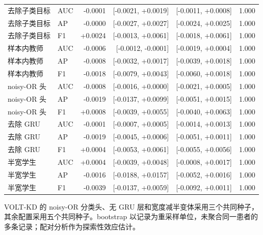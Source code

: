 \documentclass[11pt,a4paper,UTF8,fontset=windows]{ctexart}
\begin{document}
\begin{table}[htbp]
\begin{tabularx}{\linewidth}{Ylrrrr}
去除子类目标 & AUC & -0.0001 & [-0.0021, +0.0019] & [-0.0011, +0.0008] & 1.000 \\
去除子类目标 & AP & -0.0000 & [-0.0027, +0.0027] & [-0.0024, +0.0025] & 1.000 \\
去除子类目标 & F1 & +0.0024 & [-0.0013, +0.0061] & [-0.0018, +0.0061] & 1.000 \\
样本内教师 & AUC & -0.0006 & [-0.0012, -0.0001] & [-0.0019, +0.0004] & 1.000 \\
样本内教师 & AP & -0.0008 & [-0.0032, +0.0017] & [-0.0039, +0.0018] & 1.000 \\
样本内教师 & F1 & -0.0018 & [-0.0079, +0.0043] & [-0.0060, +0.0018] & 1.000 \\
noisy-OR 头 & AUC & -0.0008 & [-0.0016, +0.0000] & [-0.0021, +0.0005] & 1.000 \\
noisy-OR 头 & AP & -0.0019 & [-0.0137, +0.0099] & [-0.0051, +0.0015] & 1.000 \\
noisy-OR 头 & F1 & +0.0008 & [-0.0039, +0.0055] & [-0.0040, +0.0063] & 1.000 \\
去除 GRU & AUC & -0.0001 & [-0.0007, +0.0005] & [-0.0014, +0.0013] & 1.000 \\
去除 GRU & AP & -0.0019 & [-0.0045, +0.0006] & [-0.0051, +0.0011] & 1.000 \\
去除 GRU & F1 & +0.0004 & [-0.0053, +0.0061] & [-0.0055, +0.0056] & 1.000 \\
半宽学生 & AUC & +0.0004 & [-0.0039, +0.0048] & [-0.0008, +0.0017] & 1.000 \\
半宽学生 & AP & -0.0016 & [-0.0188, +0.0157] & [-0.0052, +0.0016] & 1.000 \\
半宽学生 & F1 & -0.0039 & [-0.0137, +0.0059] & [-0.0092, +0.0011] & 1.000 \\
\bottomrule
\end{tabularx}

\end{table}

VOLT-KD 的 noisy-OR 分类头、无 GRU 层和宽度减半变体采用三个共同种子，其余配置采用五个共同种子。bootstrap 以记录为重采样单位，未聚合同一患者的多条记录；配对分析作为探索性效应估计。
\end{document}
